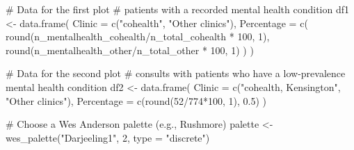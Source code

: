 \documentclass[
  letterpaper,
  DIV=11,
  numbers=noendperiod,
  oneside]{scrartcl}
\newenvironment{Shaded}{\begin{snugshade}}{\end{snugshade}}
\newcommand{\AttributeTok}[1]{\textcolor[rgb]{0.40,0.45,0.13}{#1}}
\newcommand{\CommentTok}[1]{\textcolor[rgb]{0.37,0.37,0.37}{#1}}
\newcommand{\DecValTok}[1]{\textcolor[rgb]{0.68,0.00,0.00}{#1}}
\newcommand{\FloatTok}[1]{\textcolor[rgb]{0.68,0.00,0.00}{#1}}
\newcommand{\FunctionTok}[1]{\textcolor[rgb]{0.28,0.35,0.67}{#1}}
\newcommand{\NormalTok}[1]{\textcolor[rgb]{0.00,0.23,0.31}{#1}}
\newcommand{\OtherTok}[1]{\textcolor[rgb]{0.00,0.23,0.31}{#1}}
\newcommand{\SpecialCharTok}[1]{\textcolor[rgb]{0.37,0.37,0.37}{#1}}
\newcommand{\StringTok}[1]{\textcolor[rgb]{0.13,0.47,0.30}{#1}}
\begin{document}
\begin{Shaded}
\begin{Highlighting}[]
\CommentTok{\# Data for the first plot}
\CommentTok{\# patients with a recorded mental health condition}
\NormalTok{df1 }\OtherTok{\textless{}{-}} \FunctionTok{data.frame}\NormalTok{(}
  \AttributeTok{Clinic =} \FunctionTok{c}\NormalTok{(}\StringTok{"cohealth"}\NormalTok{, }\StringTok{"Other clinics"}\NormalTok{),}
  \AttributeTok{Percentage =} \FunctionTok{c}\NormalTok{(}
    \FunctionTok{round}\NormalTok{(n\_mentalhealth\_cohealth}\SpecialCharTok{/}\NormalTok{n\_total\_cohealth }\SpecialCharTok{*} \DecValTok{100}\NormalTok{, }\DecValTok{1}\NormalTok{),}
    \FunctionTok{round}\NormalTok{(n\_mentalhealth\_other}\SpecialCharTok{/}\NormalTok{n\_total\_other }\SpecialCharTok{*} \DecValTok{100}\NormalTok{, }\DecValTok{1}\NormalTok{)}
\NormalTok{  )}
\NormalTok{)}

\CommentTok{\# Data for the second plot}
\CommentTok{\# consults with patients who have a low{-}prevalence mental health condition}
\NormalTok{df2 }\OtherTok{\textless{}{-}} \FunctionTok{data.frame}\NormalTok{(}
  \AttributeTok{Clinic =} \FunctionTok{c}\NormalTok{(}\StringTok{"cohealth, Kensington"}\NormalTok{, }\StringTok{"Other clinics"}\NormalTok{),}
  \AttributeTok{Percentage =} \FunctionTok{c}\NormalTok{(}\FunctionTok{round}\NormalTok{(}\DecValTok{52}\SpecialCharTok{/}\DecValTok{774}\SpecialCharTok{*}\DecValTok{100}\NormalTok{, }\DecValTok{1}\NormalTok{), }\FloatTok{0.5}\NormalTok{)}
\NormalTok{)}

\CommentTok{\# Choose a Wes Anderson palette (e.g., \textquotesingle{}Rushmore\textquotesingle{})}
\NormalTok{palette }\OtherTok{\textless{}{-}} \FunctionTok{wes\_palette}\NormalTok{(}\StringTok{"Darjeeling1"}\NormalTok{, }\DecValTok{2}\NormalTok{, }\AttributeTok{type =} \StringTok{"discrete"}\NormalTok{)}


\end{Highlighting}
\end{Shaded}
\end{document}
